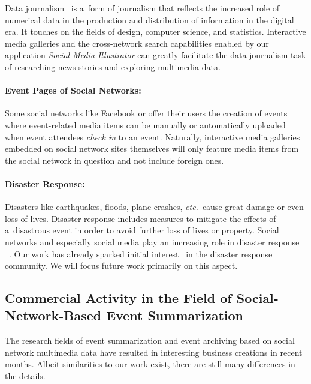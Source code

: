 Data journalism~\cite{rogers2011datajournalism,gray2012data}
is a~form of journalism that reflects the increased role
of numerical data in the production and distribution of information
in the digital era.
It touches on the fields of design, computer science, and statistics.
Interactive media galleries and the cross-network search capabilities enabled by our application \emph{Social Media Illustrator}
can greatly facilitate the data journalism task of researching news stories and exploring multimedia data.

\paragraph{Event Pages of Social Networks:}

Some social networks like Facebook or \googleplus
offer their users the creation of events where
event-related media items can be manually or automatically
uploaded when event attendees \emph{check in} to an event.
Naturally, interactive media galleries embedded on
social network sites themselves will only feature media items
from the social network in question and not include foreign ones.

\paragraph{Disaster Response:}

Disasters like earthquakes, floods, plane crashes, \emph{etc.}\ cause
great damage or even loss of lives.
Disaster response includes measures to
mitigate the effects of a~disastrous event
in order to avoid further loss of lives or property.
Social networks and especially social media
play an increasing role in disaster response%
~\cite{shklovski2008disasterresponse,sutton2008backchannels}.
Our work has already sparked initial interest~\cite{meier2013wikipedia}
in the disaster response community.
We will focus future work primarily on this aspect.

\subsection[Commercial Activity in the Field of Event Summarization]{Commercial Activity in the Field of Social-Network-Based Event Summarization}

The research fields of event summarization and event archiving
based on social network multimedia data have resulted in
interesting business creations in recent months.
Albeit similarities to our work exist,
there are still many differences in the details.

